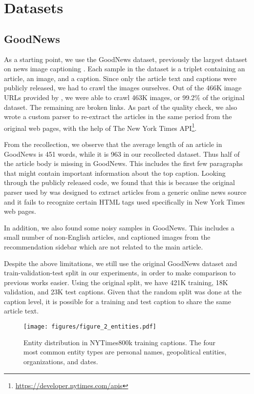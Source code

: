 \section{Datasets}

\subsection{GoodNews}

As a starting point, we use the GoodNews dataset, previously the largest
dataset on news image captioning \cite{Biten2019GoodNews}. Each sample in the
dataset is a triplet containing an article, an image, and a caption. Since only
the article text and captions were publicly released, we had to crawl the
images ourselves. Out of the 466K image URLs provided by
\cite{Biten2019GoodNews}, we were able to crawl 463K images, or 99.2\% of the
original dataset. The remaining are broken links. As part of the quality check,
we also wrote a custom parser to re-extract the articles in the same period
from the original web pages, with the help of The New York Times
API\footnote{\href{https://developer.nytimes.com/apis}{https://developer.nytimes.com/apis}}.

From the recollection, we observe that the average length of an article in
GoodNews is 451 words, while it is 963 in our recollected dataset. Thus half of
the article body is missing in GoodNews. This includes the first few paragraphs
that might contain important information about the top caption. Looking through
the publicly released code, we found that this is because the original parser
used by \cite{Biten2019GoodNews} was designed to extract articles from a
generic online news source and it fails to recognize certain HTML tags used
specifically in New York Times web pages.

In addition, we also found some noisy samples in GoodNews. This includes a
small number of non-English articles, and captioned images from the
recommendation sidebar which are not related to the main article.

Despite the above limitations, we still use the original GoodNews dataset and
train-validation-test split in our experiments, in order to make comparison to
previous works easier. Using the original split, we have 421K training, 18K
validation, and 23K test captions. Given that the random split was done at the
caption level, it is possible for a training and test caption to share the same
article text.


\begin{figure}[t]
   \begin{center}
   \texttt{[image: figures/figure\_2\_entities.pdf]}
   \end{center}
      \caption{Entity distribution in NYTimes800k training captions. The four
               most common entity types are personal names, geopolitical
               entities, organizations, and dates.}
   \label{fig:entities}
\end{figure}

